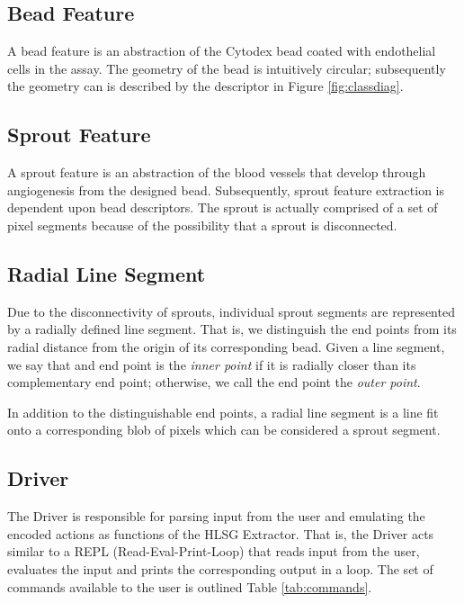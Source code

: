 \documentclass{sig-alternate}
\begin{document}
	\subsection{Bead Feature} %
	\label{sub:Bead Feature}
		A bead feature is an abstraction of the Cytodex bead coated with
		endothelial cells in the assay. The geometry of the bead is intuitively
		circular; subsequently the geometry can is described by the descriptor
		in Figure \ref{fig:classdiag}.

	\subsection{Sprout Feature} %
	\label{sub:Sprout Feature}
		A sprout feature is an abstraction of the blood vessels that develop
		through angiogenesis from the designed bead. Subsequently, sprout
		feature extraction is dependent upon bead descriptors. The sprout is
		actually comprised of a set of pixel segments because of the
		possibility that a sprout is disconnected.

	\subsection{Radial Line Segment} %
	\label{sub:Radial Line Segment}
		Due to the disconnectivity of sprouts, individual sprout segments
		are represented by a radially defined line segment. That is, we
		distinguish the end points from its radial distance from the origin
		of its corresponding bead. Given a line segment, we say that and
		end point is the \emph{inner point} if it is radially closer than
		its complementary end point; otherwise, we call the end point the
		\emph{outer point}.

		In addition to the distinguishable end points, a radial line
		segment is a line fit onto a corresponding blob of pixels which can
		be considered a sprout segment.

	\subsection{Driver} %
	\label{sub:Driver}
		The Driver is responsible for parsing input from the user and emulating
		the encoded actions as functions of the HLSG Extractor. That is, the
		Driver acts similar to a REPL (Read-Eval-Print-Loop) that reads input
		from the user, evaluates the input and prints the corresponding output
		in a loop. The set of commands available to the user is outlined Table
		\ref{tab:commands}.
\end{document}
